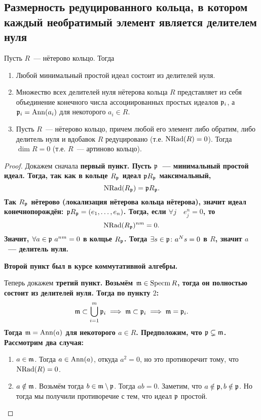 	
	\subsection{Размерность редуцированного кольца, в котором каждый необратимый элемент является делителем нуля}


 	\begin{lemma}\label{4_lemma_1} 
 		Пусть $R$~--- нётерово кольцо. Тогда 
 		\begin{enumerate}
 			\item Любой минимальный простой идеал состоит из делителей нуля. 
 			\item Множество всех делителей нуля нётерова кольца $R$ представляет из себя объединение конечного числа ассоциированных простых идеалов $\mathfrak{p}_{i}$, а $\mathfrak{p}_i = \operatorname{Ann}(a_i)$ для некоторого $a_i \in R$.
 			\item Пусть $R$~--- нётерово кольцо, причем любой его элемент либо обратим, либо делитель нуля и вдобавок $R$ редуцировано (т.е. $\operatorname{NRad}(R) = 0$). Тогда $\dim{R} = 0$ (т.е. $R$~--- артиново кольцо). 
 		\end{enumerate}
 	\end{lemma}
 	\begin{proof}

 		Докажем сначала \bf{первый пункт}.\hypertarget{bilet_9}{} Пусть $\mathfrak{p}$~--- минимальный простой идеал. Тогда, так как в кольце $R_{\mathfrak{p}}$ идеал $\mathfrak{p} R_{\mathfrak{p}}$ максимальный, 
 		\[
 			\operatorname{NRad}(R_{\mathfrak{p}}) = \mathfrak{p} R_{\mathfrak{p}}.
 		\]
 		Так $R_{\mathfrak{p}}$ нётерово (локализация нётерова кольца нётерова), значит идеал конечнопорождён: $\mathfrak{p} R_{\mathfrak{p}} = (e_1, \ldots, e_n)$. Тогда, если $\forall j \quad e_{j}^n = 0$, то
 		\[
 			\operatorname{NRad}(R_{\mathfrak{p}})^{n m} = 0.
 		\]
 		Значит, $\forall a \in \mathfrak{p} \  a^{nm} = 0$ в колцье $R_{\mathfrak{p}}$. Тогда $\exists s \in \mathfrak{p} \colon a^N s = 0$ в $R$, значит $a$~--- делитель нуля. 
 		

 		\bf{Второй}\hypertarget{bilet_10}{} пункт был в курсе коммутативной алгебры. 
 

 		Теперь докажем \bf{третий}\hypertarget{bilet_11}{} пункт. Возьмём $\mathfrak{m} \in \operatorname{Specm}{R}$, тогда он полностью состоит из делителей нуля. Тогда по пункту $2$:
 		\[
 			\mathfrak{m} \subset \bigcup_{i = 1}^{m} \mathfrak{p}_i \implies \mathfrak{m} \subset \mathfrak{p}_i \implies \mathfrak{m} = \mathfrak{p}_i.
 		\]
 		Тогда $\mathfrak{m} = \operatorname{Ann}(a)$ для некоторого $a \in R$. Предположим, что $\mathfrak{p} \subsetneq \mathfrak{m}$. Рассмотрим два случая: 
 		\begin{enumerate}
 			\item $a \in \mathfrak{m}$. Тогда $a \in \operatorname{Ann}(a)$, откуда $a^2 = 0$, но это противоречит тому, что $\operatorname{NRad}(R) = 0$. 

 			\item $a \notin \mathfrak{m}$. Возьмём тогда $b \in \mathfrak{m} \setminus \mathfrak{p}$. Тогда $a b = 0$. Заметим, что $a \notin \mathfrak{p}, b \notin \mathfrak{p}$. Но тогда мы получили противоречие с тем, что идеал $\mathfrak{p}$ простой. 
 		\end{enumerate}
 	\end{proof}

